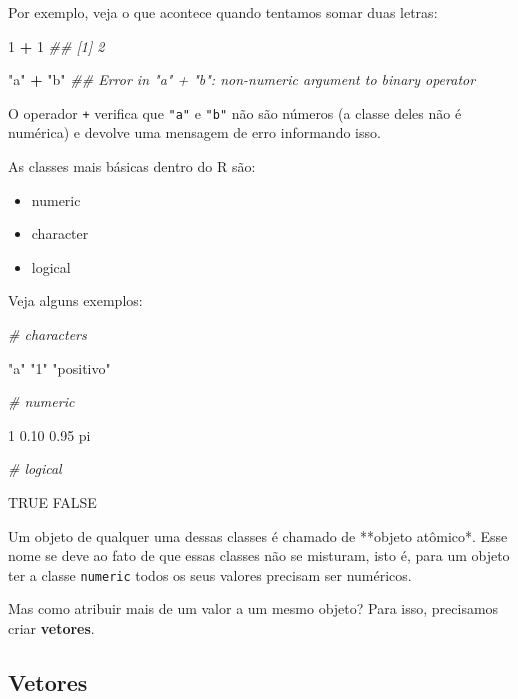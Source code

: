 \documentclass[]{book}
\newenvironment{Shaded}{\begin{snugshade}}{\end{snugshade}}
\newcommand{\CommentTok}[1]{\textcolor[rgb]{0.56,0.35,0.01}{\textit{#1}}}
\newcommand{\DecValTok}[1]{\textcolor[rgb]{0.00,0.00,0.81}{#1}}
\newcommand{\FloatTok}[1]{\textcolor[rgb]{0.00,0.00,0.81}{#1}}
\newcommand{\NormalTok}[1]{#1}
\newcommand{\OperatorTok}[1]{\textcolor[rgb]{0.81,0.36,0.00}{\textbf{#1}}}
\newcommand{\OtherTok}[1]{\textcolor[rgb]{0.56,0.35,0.01}{#1}}
\newcommand{\StringTok}[1]{\textcolor[rgb]{0.31,0.60,0.02}{#1}}
\providecommand{\tightlist}{%
  \setlength{\itemsep}{0pt}\setlength{\parskip}{0pt}}
\begin{document}
Por exemplo, veja o que acontece quando tentamos somar duas letras:

\begin{Shaded}
\begin{Highlighting}[]
\DecValTok{1} \OperatorTok{+}\StringTok{ }\DecValTok{1}
\CommentTok{## [1] 2}

\StringTok{"a"} \OperatorTok{+}\StringTok{ "b"}
\CommentTok{## Error in "a" + "b": non-numeric argument to binary operator}
\end{Highlighting}
\end{Shaded}

O operador \texttt{+} verifica que \texttt{"a"} e \texttt{"b"} não são números (a classe deles não é numérica) e devolve uma mensagem de erro informando isso.

As classes mais básicas dentro do R são:

\begin{itemize}
\tightlist
\item
  numeric
\item
  character
\item
  logical
\end{itemize}

Veja alguns exemplos:

\begin{Shaded}
\begin{Highlighting}[]
\CommentTok{# characters}

\StringTok{"a"}
\StringTok{"1"}
\StringTok{"positivo"}

\CommentTok{# numeric}

\DecValTok{1}
\FloatTok{0.10}
\FloatTok{0.95}
\NormalTok{pi}

\CommentTok{# logical}

\OtherTok{TRUE}
\OtherTok{FALSE}
\end{Highlighting}
\end{Shaded}

Um objeto de qualquer uma dessas classes é chamado de **objeto atômico*. Esse nome se deve ao fato de que essas classes não se misturam, isto é, para um objeto ter a classe \texttt{numeric} todos os seus valores precisam ser numéricos.

Mas como atribuir mais de um valor a um mesmo objeto? Para isso, precisamos criar \textbf{vetores}.

\hypertarget{vetores}{%
\subsection{Vetores}\label{vetores}}
\end{document}
